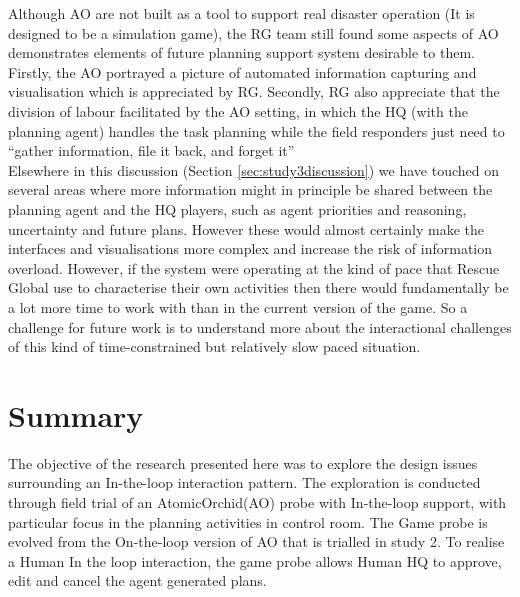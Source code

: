 Although AO are not built as a tool to support real disaster operation (It is designed to be a simulation game), the RG team still found some aspects of AO demonstrates elements of future planning support system desirable to them. Firstly, the AO portrayed a picture of automated information capturing and visualisation which is appreciated by RG. Secondly, RG also appreciate that the division of labour facilitated by the AO setting, in which the HQ (with the planning agent) handles the task planning while the field responders just need to ``gather information, file it back, and forget it''\\

Elsewhere in this discussion (Section \ref{sec:study3discussion}) we have touched on several areas where more information might in principle be shared between the planning agent and the HQ players, such as agent priorities and reasoning, uncertainty and future plans. However these would almost certainly make the interfaces and visualisations more complex and increase the risk of information overload. However, if the system were operating at the kind of pace that Rescue Global use to characterise their own activities then there would fundamentally be a lot more time to work with than in the current version of the game. So a challenge for future work is to understand more about the interactional challenges of this kind of time-constrained but relatively slow paced situation.\\

\section{Summary}
The objective of the research presented here was to explore the design issues surrounding an In-the-loop interaction pattern. The exploration is conducted through field trial of an AtomicOrchid(AO) probe with In-the-loop support, with particular focus in the planning activities in control room. The Game probe is evolved from the On-the-loop version of AO that is trialled in study 2. To realise a Human In the loop interaction, the game probe allows Human HQ to approve, edit and cancel the agent generated plans. \\

